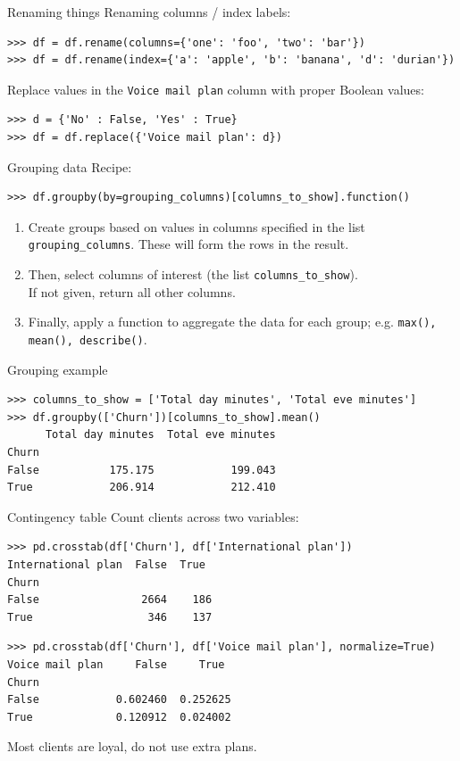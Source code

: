 \documentclass[aspectratio=169,usenames,dvipsnames]{beamer}
\begin{document}
\begin{frame}[fragile]{Renaming things}
Renaming columns / index labels:
\begin{lstlisting}
>>> df = df.rename(columns={'one': 'foo', 'two': 'bar'})
>>> df = df.rename(index={'a': 'apple', 'b': 'banana', 'd': 'durian'})
\end{lstlisting}

Replace values in the \texttt{Voice mail plan} column with proper Boolean values:
\begin{lstlisting}
>>> d = {'No' : False, 'Yes' : True}
>>> df = df.replace({'Voice mail plan': d})
\end{lstlisting}

\end{frame}


\begin{frame}[fragile]{Grouping data}
Recipe:
\begin{lstlisting}
>>> df.groupby(by=grouping_columns)[columns_to_show].function()
\end{lstlisting}

\begin{enumerate}
\item Create groups based on values in columns specified
    in the list \texttt{grouping\_columns}.
    These will form the rows in the result.
\item Then, select columns of interest (the list \texttt{columns\_to\_show}). \\
    If not given, return all other columns.
\item Finally, apply a function to aggregate the data for each group;
    e.g. \texttt{max(), mean(), describe()}.
\end{enumerate}
\end{frame}


\begin{frame}[fragile]{Grouping example}
\begin{lstlisting}
>>> columns_to_show = ['Total day minutes', 'Total eve minutes']
>>> df.groupby(['Churn'])[columns_to_show].mean()
      Total day minutes  Total eve minutes
Churn
False           175.175            199.043
True            206.914            212.410
\end{lstlisting}
\end{frame}

\begin{frame}[fragile]{Contingency table}
Count clients across two variables:
\begin{lstlisting}
>>> pd.crosstab(df['Churn'], df['International plan'])
International plan  False  True
Churn
False                2664    186
True                  346    137
\end{lstlisting}
\pause
\begin{lstlisting}
>>> pd.crosstab(df['Churn'], df['Voice mail plan'], normalize=True)
Voice mail plan     False     True
Churn
False            0.602460  0.252625
True             0.120912  0.024002
\end{lstlisting}

Most clients are loyal, do not use extra plans.
\end{frame}
\end{document}
